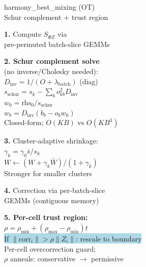 \documentclass[8pt]{article}
\newlength{\colw}
\begin{document}
\begin{minipage}[t]{\colw}
\begin{tcolorbox}[colback=hdrC, colframe=hdrC, fontupper=\bfseries\footnotesize\color{white},
    arc=2pt, left=2pt, right=2pt, top=1pt, bottom=1pt]
\centering harmony\_best\_mixing (OT)\\[-2pt]
{\scriptsize\mdseries Schur complement + trust region}
\end{tcolorbox}
\vspace{1pt}

\begin{stepbox}
\textbf{1.} Compute $S_{\Phi Z}$ via\\
pre-permuted batch-slice GEMMs
\end{stepbox}\vspace{1pt}

\begin{keyboxB}
\textbf{2. Schur complement solve}\\
{\scriptsize (no inverse/Cholesky needed):}\\
$D_\text{inv}\!=\!1/(O\!+\!\lambda_\text{batch})$ {\scriptsize (diag)}\\
$s_\text{schur}\!=\!s_k-\sum_b o_{kb}^2 D_\text{inv}$\\
$w_0\!=\!\text{rhs}_0/s_\text{schur}$\\
$w_b\!=\!D_\text{inv}(b_b-o_b w_0)$\\
{\scriptsize\color{keychange} Closed-form; $O(KB)$ vs $O(KB^3)$}
\end{keyboxB}\vspace{1pt}

\begin{keyboxB}
\textbf{3.} Cluster-adaptive shrinkage:\\
$\gamma_k\!=\!\gamma_0\bar{s}/s_k$\\
$W\!\gets\!(W\!+\!\gamma_k\bar{W})/(1\!+\!\gamma_k)$\\
{\scriptsize Stronger for smaller clusters}
\end{keyboxB}\vspace{1pt}

\begin{stepbox}
\textbf{4.} Correction via per-batch-slice\\
GEMMs (contiguous memory)
\end{stepbox}\vspace{1pt}

\begin{keyboxB}
\textbf{5. Per-cell trust region:}\\
$\rho\!=\!\rho_\text{min}+(\rho_\text{max}\!-\!\rho_\text{min})t$\\
\colorbox{lightblue}{\scriptsize If $\|\text{corr}_i\|>\rho\|Z_i\|$: rescale to boundary}\\
{\scriptsize\color{keychange} Per-cell overcorrection guard;\\
$\rho$ anneals: conservative $\to$ permissive}
\end{keyboxB}\vspace{1pt}


\end{minipage}
\end{document}
